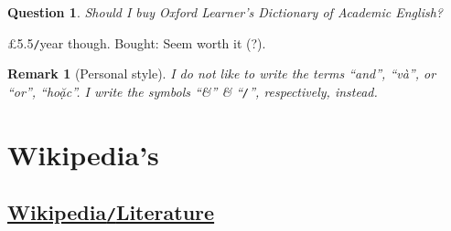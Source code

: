\documentclass[oneside]{book}
\numberwithin{equation}{section}
\newtheorem{question}{Question}[chapter]
\newtheorem{remark}{Remark}[chapter]
\begin{document}
\begin{question}
	Should I buy Oxford Learner's Dictionary of Academic English?
\end{question}
\pounds 5.5\texttt{/}year though. Bought: Seem worth it (?).

\begin{remark}[Personal style]
	I do not like to write the terms ``and'', ``và'', or ``or'', ``hoặc''. I write the symbols ``\&'' \& ``\emph{\texttt{/}}'', respectively, instead.
\end{remark}


\chapter{Wikipedia's}

\section{\href{https://en.wikipedia.org/wiki/Literature}{Wikipedia\texttt{/}Literature}}
\end{document}
